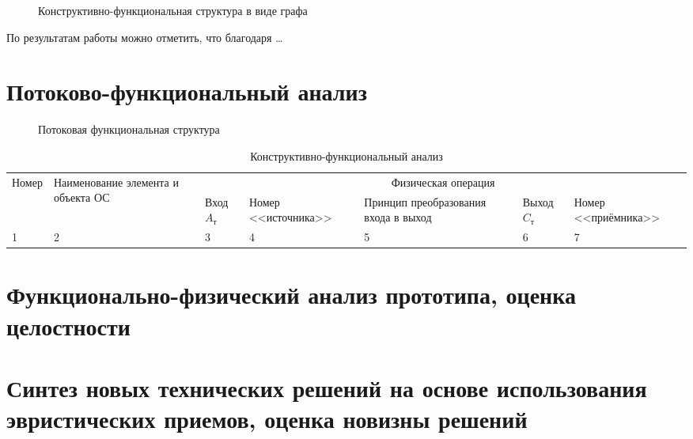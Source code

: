 \begin{figure}[h!]
    \caption{Конструктивно-функциональная структура в виде графа}
\end{figure}

По результатам работы можно отметить, что благодаря \ldots

\chapter{Потоково-функциональный анализ}

\begin{figure}[h!]
    \caption{Потоковая функциональная структура}
\end{figure}

\begin{table}[h]
    \center
    \caption{Конструктивно-функциональный анализ}
    \begin{tabularx}{\textwidth}{|X|X|X|X|X|X|X|}
        \hline
        \multirow{2}{*}{Номер} & \multirow{2}{*}{Наименование элемента и объекта ОС} & \multicolumn{5}{|c|}{Физическая операция} \\ \cline{3-7}
        & & Вход \( A_\text{т} \) & Номер <<источника>> & Принцип преобразования входа в выход & Выход \( C_\text{т} \) & Номер <<приёмника>> \\ \hline
        1 & 2 & 3 & 4 & 5 & 6 & 7 \\ \hline
    \end{tabularx}
\end{table}

\chapter{Функционально-физический анализ прототипа, оценка целостности}
\chapter{Синтез новых технических решений на основе использования эвристических приемов, 
    оценка новизны решений}
